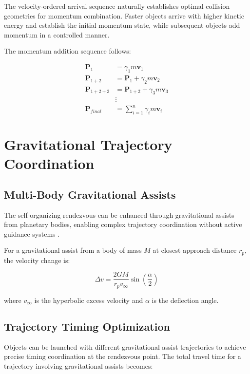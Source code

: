 \documentclass[11pt,a4paper]{article}
\theoremstyle{remark}
\begin{document}
The velocity-ordered arrival sequence naturally establishes optimal collision geometries for momentum combination. Faster objects arrive with higher kinetic energy and establish the initial momentum state, while subsequent objects add momentum in a controlled manner.

The momentum addition sequence follows:

\begin{align}
\mathbf{P}_1 &= \gamma_1 m \mathbf{v}_1 \\
\mathbf{P}_{1+2} &= \mathbf{P}_1 + \gamma_2 m \mathbf{v}_2 \\
\mathbf{P}_{1+2+3} &= \mathbf{P}_{1+2} + \gamma_3 m \mathbf{v}_3 \\
&\vdots \\
\mathbf{P}_{final} &= \sum_{i=1}^{n} \gamma_i m \mathbf{v}_i
\end{align}

\section{Gravitational Trajectory Coordination}

\subsection{Multi-Body Gravitational Assists}

The self-organizing rendezvous can be enhanced through gravitational assists from planetary bodies, enabling complex trajectory coordination without active guidance systems \cite{battin1999introduction}.

For a gravitational assist from a body of mass $M$ at closest approach distance $r_p$, the velocity change is:

\begin{equation}
\Delta v = \frac{2GM}{r_p v_{\infty}} \sin\left(\frac{\alpha}{2}\right)
\label{eq:gravity_assist}
\end{equation}

where $v_{\infty}$ is the hyperbolic excess velocity and $\alpha$ is the deflection angle.

\subsection{Trajectory Timing Optimization}

Objects can be launched with different gravitational assist trajectories to achieve precise timing coordination at the rendezvous point. The total travel time for a trajectory involving gravitational assists becomes:
\end{document}
